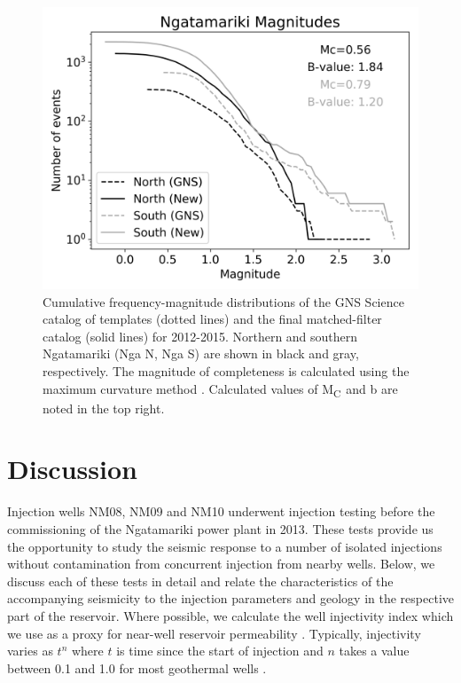 \begin{figure}[h!]
\begin{center}
\includegraphics[width=0.70\columnwidth]{Chapter_3_Nga/figures/NgaN_min4_SVD1-5_PCA_mags_vs_temps/Nga_cumulative_bval_plots_combined_12-5_original}
\caption{{Cumulative frequency-magnitude distributions of the GNS Science catalog
of templates (dotted lines) and the final matched-filter catalog (solid
lines) for 2012-2015. Northern and southern Ngatamariki (Nga N, Nga S)
are shown in black and gray, respectively. The magnitude of completeness
is calculated using the maximum curvature method \protect\citep{Wiemer_1997} .
Calculated values of M\textsubscript{C~}and b are noted in the top
right.
{\label{121528}}%
}}
\end{center}
\end{figure}

\section{Discussion}\label{discussion}
Injection wells NM08, NM09 and NM10 underwent injection testing before the commissioning of the Ngatamariki power plant in 2013. These tests provide us the opportunity to study the seismic response to a number of isolated injections without contamination from concurrent injection from nearby wells. Below, we discuss each of these tests in detail and relate the characteristics of the accompanying seismicity to the injection parameters and geology in the respective part of the reservoir. Where possible, we calculate the well injectivity index which we use as a proxy for near-well reservoir permeability \citep{Watson_2013}. Typically, injectivity varies as $t^{n}$ where $t$ is time since the start of injection and $n$ takes a value between 0.1 and 1.0 for most geothermal wells \citep{Clearwater_2015,grant2013thermal}.

